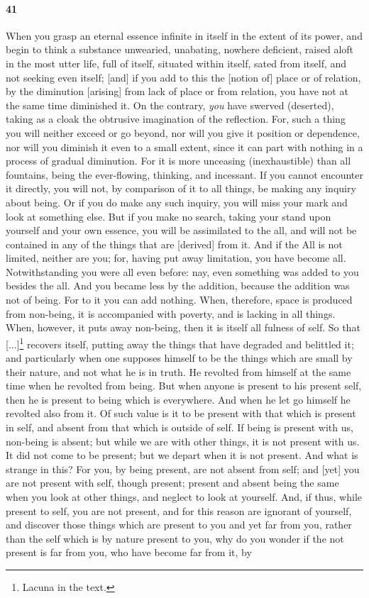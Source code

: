 \documentclass{article}
\begin{document}
\paragraph{41} When you grasp an eternal essence infinite in itself in the extent of its power, and begin to think a substance unwearied, unabating, nowhere deficient, raised aloft in the most utter life, full of itself, situated within itself, sated from itself, and not seeking even itself; [and] if you add to this the [notion of] place or of relation, by the diminution [arising] from lack of place or from relation, you have not at the same time diminished it. On the contrary, \textit{you} have swerved (deserted), taking as a cloak the obtrusive imagination of the reflection. For, such a thing you will neither exceed or go beyond, nor will you give it position or dependence, nor will you diminish it even to a small extent, since it can part with nothing in a process of gradual diminution. For it is more unceasing (inexhaustible) than all fountains, being the ever-flowing, thinking, and incessant. If you cannot encounter it directly, you will not, by comparison of it to all things, be making any inquiry about being. Or if you do make any such inquiry, you will miss your mark and look at something else. But if you make no search, taking your stand upon yourself and your own essence, you will be assimilated to the all, and will not be contained in any of the things that are [derived] from it. And if the All is not limited, neither are you; for, having put away limitation, you have become all. Notwithstanding you were all even before: nay, even something was added to you besides the all. And you became less by the addition, because the addition was not of being. For to it you can add nothing. When, therefore, space is produced from non-being, it is accompanied with poverty, and is lacking in all things. When, however, it puts away non-being, then it is itself all fulness of self. So that [...]\footnote{Lacuna in the text.} recovers itself, putting away the things that have degraded and belittled it; and particularly when one supposes himself to be the things which are small by their nature, and not what he is in truth. He revolted from himself at the same time when he revolted from being. But when anyone is present to his present self, then he is present to being which is everywhere. And when he let go himself he revolted also from it. Of such value is it to be present with that which is present in self, and absent from that which is outside of self. If being is present with us, non-being is absent; but while we are with other things, it is not present with us. It did not come to be present; but we depart when it is not present. And what is strange in this? For you, by being present, are not absent from self; and [yet] you are not present with self, though present; present and absent being the same when you look at other things, and neglect to look at yourself. And, if thus, while present to self, you are not present, and for this reason are ignorant of yourself, and discover those things which are present to you and yet far from you, rather than the self which is by nature present to you, why do you wonder if the not present is far from you, who have become far from it, by 
\end{document}

